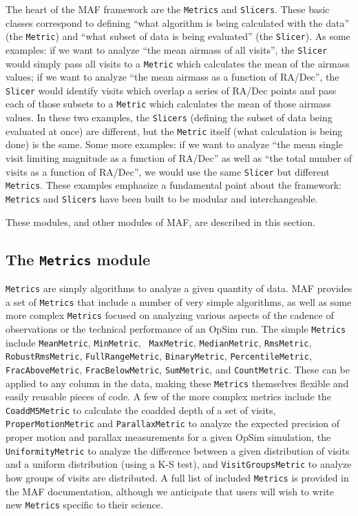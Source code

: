 \documentclass[]{spie}  %
\begin{document}
The heart of the MAF framework are the {\tt Metrics} and {\tt Slicers}. These
basic classes correspond to defining ``what algorithm is being
calculated with the data'' (the {\tt Metric}) and ``what subset of data is being
evaluated'' (the {\tt Slicer}). As some examples: if we want to
analyze ``the mean airmass of all visits'', the {\tt Slicer} would simply
pass all visits to a {\tt Metric} which calculates the mean of the airmass
values; if we want to analyze ``the mean airmass as a function of
RA/Dec'', the {\tt Slicer} would identify visits which overlap a series of
RA/Dec points and pass each of those subsets to a {\tt Metric} which
calculates the mean of those airmass values. In these two examples,
the {\tt Slicers} (defining the subset of data being evaluated at once) are
different, but the {\tt Metric} itself (what calculation is being done) is
the same. Some more examples: if we want to analyze ``the mean single
visit limiting magnitude as a function of RA/Dec'' as well as ``the
total number of visits as a function of RA/Dec'', we would use the
same {\tt Slicer} but different {\tt Metrics}. These examples emphasize a
fundamental point about the framework: {\tt Metrics} and {\tt Slicers} have been
built to be modular and interchangeable.

These modules, and other modules of MAF, are described in this
section. 

\subsection{The {\tt Metrics} module}

{\tt Metrics} are simply
algorithms to analyze a given quantity of data. MAF provides a set of
{\tt Metrics}
that include a number of very simple algorithms, as well as some more
complex {\tt Metrics} focused on analyzing various aspects of the cadence of
observations or the technical performance of an OpSim run. The simple
{\tt Metrics} include {\tt MeanMetric}, {\tt MinMetric}, {\tt
  MaxMetric}, {\tt MedianMetric}, {\tt RmsMetric}, {\tt
  RobustRmsMetric}, {\tt FullRangeMetric}, {\tt BinaryMetric},
{\tt PercentileMetric}, {\tt FracAboveMetric}, {\tt FracBelowMetric},
{\tt SumMetric}, and {\tt CountMetric}. These can be applied to any column in the data,
making these {\tt Metrics} themselves flexible and easily reusable pieces of
code. A few of the more complex metrics include the {\tt CoaddM5Metric} to
calculate the coadded depth of a set of visits, {\tt
  ProperMotionMetric} and {\tt ParallaxMetric} to analyze the expected
precision of proper motion and parallax measurements for a given OpSim
simulation, the {\tt UniformityMetric} to analyze the difference between a
given distribution of visits and a uniform distribution (using a K-S
test), and {\tt VisitGroupsMetric} to analyze how groups of visits are
distributed. A full list of included {\tt Metrics} is provided in the MAF
documentation, although we anticipate that users will wish to write
new {\tt Metrics} specific to their science.
\end{document}
